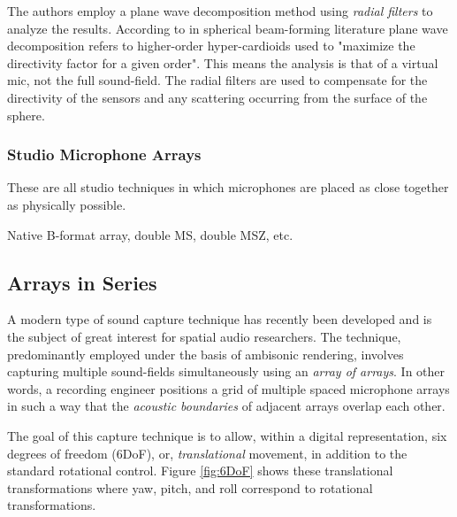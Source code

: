 The authors employ a plane wave decomposition method using \textit{radial filters} to analyze the results. According to \cite{politis2016jsambisonics} in spherical beam-forming literature plane wave decomposition refers to higher-order hyper-cardioids used to "maximize  the directivity factor for a given order". This means the analysis is that of a virtual mic, not the full sound-field. The radial filters are used to compensate for the directivity of the sensors and any scattering occurring from the surface of the sphere. 





\subsubsection{Studio Microphone Arrays}

These are all studio techniques in which microphones are placed as close together as physically possible. 

Native B-format array, double MS, double MSZ, etc.

\subsection{Arrays in Series}

A modern type of sound capture technique has recently been developed and is the subject of great interest for spatial audio researchers. The technique, predominantly employed under the basis of ambisonic rendering, involves capturing multiple sound-fields simultaneously using an \textit{array of arrays}. In other words, a recording engineer positions a grid of multiple spaced microphone arrays in such a way that the \textit{acoustic boundaries} of adjacent arrays overlap each other. 

The goal of this capture technique is to allow, within a digital representation, six degrees of freedom (6DoF), or, \textit{translational} movement, in addition to the standard rotational control. Figure \ref{fig:6DoF} shows these translational transformations where yaw, pitch, and roll correspond to rotational transformations. 

